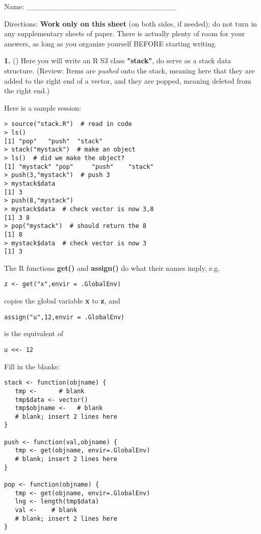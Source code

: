 \documentclass[twocolumn]{article}
\begin{document}
Name: \_\_\_\_\_\_\_\_\_\_\_\_\_\_\_\_\_\_\_\_\_\_\_\_\_\_\_\_

Directions: {\bf Work only on this sheet} (on both sides, if needed); do
not turn in any supplementary sheets of paper. There is actually plenty
of room for your answers, as long as you organize yourself BEFORE
starting writing.

{\bf 1.} () Here you will write an R S3 class {\bf "stack"}, do serve as
a stack data structure.  (Review:  Items are {\it pushed} onto the
stack, meaning here that they are added to the right end of a vector,
and they are popped, meaning deleted from the right end.)  

Here is a sample session:

\begin{lstlisting}
> source("stack.R")  # read in code
> ls()
[1] "pop"   "push"  "stack"
> stack("mystack")  # make an object
> ls()  # did we make the object?
[1] "mystack" "pop"     "push"    "stack"  
> push(3,"mystack")  # push 3
> mystack$data  
[1] 3
> push(8,"mystack")
> mystack$data  # check vector is now 3,8
[1] 3 8
> pop("mystack")  # should return the 8
[1] 8
> mystack$data  # check vector is now 3
[1] 3
\end{lstlisting}

The R functions {\bf get()} and {\bf assign()} do what their names
imply, e.g.

\begin{lstlisting}
z <- get("x",envir = .GlobalEnv)
\end{lstlisting}

copies the global variable {\bf x} to {\bf z}, and

\begin{lstlisting}
assign("u",12,envir = .GlobalEnv)
\end{lstlisting}

is the equivalent of

\begin{lstlisting}
u <<- 12
\end{lstlisting}

Fill in the blanks:

\begin{lstlisting}
stack <- function(objname) {
   tmp <-      # blank
   tmp$data <- vector()
   tmp$objname <-   # blank
   # blank; insert 2 lines here
}

push <- function(val,objname) {
   tmp <- get(objname, envir=.GlobalEnv)
   # blank; insert 2 lines here
}

pop <- function(objname) {
   tmp <- get(objname, envir=.GlobalEnv)
   lng <- length(tmp$data)
   val <-    # blank
   # blank; insert 2 lines here
}
\end{lstlisting}
\end{document}
